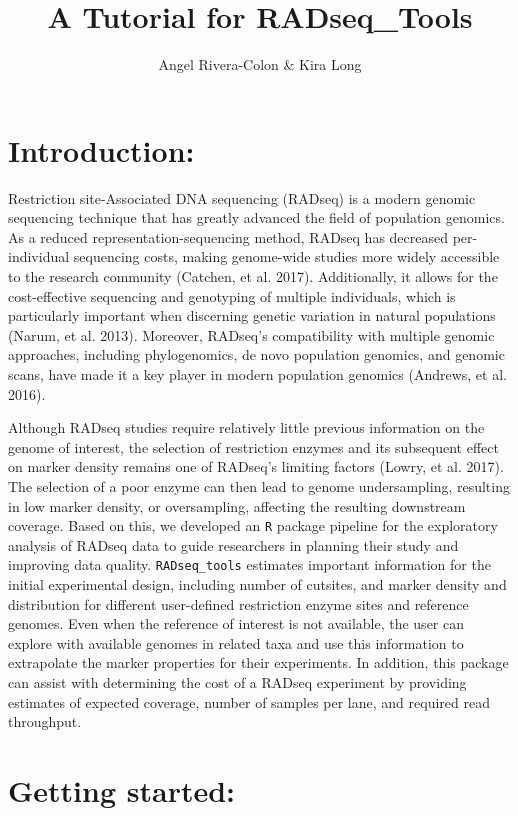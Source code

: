 \documentclass{article}
\title{A Tutorial for RADseq_Tools}
\author{Angel Rivera-Colon & Kira Long}
\begin{document}


\section*{Introduction:}

Restriction site-Associated DNA sequencing (RADseq) is a modern genomic sequencing technique that has greatly advanced the field of population genomics. As a reduced representation-sequencing method, RADseq has decreased per-individual sequencing costs, making genome-wide studies more widely accessible to the research community (Catchen, et al. 2017). Additionally, it allows for the cost-effective sequencing and genotyping of multiple individuals, which is particularly important when discerning genetic variation in natural populations (Narum, et al. 2013). Moreover, RADseq’s compatibility with multiple genomic approaches, including phylogenomics, de novo population genomics, and genomic scans, have made it a key player in modern population genomics (Andrews, et al. 2016). 

Although RADseq studies require relatively little previous information on the genome of interest, the selection of restriction enzymes and its subsequent effect on marker density remains one of RADseq’s limiting factors (Lowry, et al. 2017). The selection of a poor enzyme can then lead to genome undersampling, resulting in low marker density, or oversampling, affecting the resulting downstream coverage. Based on this, we developed an \texttt{R} package pipeline for the exploratory analysis of RADseq data to guide researchers in planning their study and improving data quality. \texttt{RADseq\_tools} estimates important information for the initial experimental design, including number of cutsites, and marker density and distribution for different user-defined restriction enzyme sites and reference genomes. Even when the reference of interest is not available, the user can explore with available genomes in related taxa and use this information to extrapolate the marker properties for their experiments. In addition, this package can assist with determining the cost of a RADseq experiment by providing estimates of expected coverage, number of samples per lane, and required read throughput. 


\section*{Getting started:}
\end{document}
